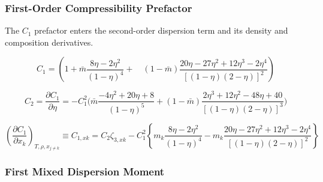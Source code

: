 \documentclass[12pt, letterpaper]{article}
\begin{document}
\subsubsection{First-Order Compressibility Prefactor}

The \(C_1\) prefactor enters the second-order dispersion term and its density and composition derivatives.

\begin{equation}
    C_{1} = \left(1+\bar{m} \frac{8 \eta-2 \eta^2}{(1-\eta)^4}+\right.\left.\quad(1-\bar{m}) \frac{20 \eta-27 \eta^2+12 \eta^3-2 \eta^4}{[(1-\eta)(2-\eta)]^2}\right)
    \label{eq:c1_disp}
\end{equation}


\begin{equation}
    C_{2}
    =\frac{\partial C_{1}}{\partial\eta}
    =- C_{1}^{2}\biggl(
    \bar{m}\frac{-4\eta^{2}+20\eta+8}{\left(1-\eta\right)^{5}}
    +(1-\bar{m})\frac{2\eta^{3}+12\eta^{2}-48\eta+40}{\left[(1-\eta)(2-\eta)\right]^{3}}
    \biggr)
    \label{eq:c2_disp}
\end{equation}


\begin{equation}
    \left(\frac{\partial C_{1}}{\partial x_{k}}\right)_{T,\rho,x_{j\neq k}}
    \equiv C_{1,xk}
    =C_{2}\zeta_{3,xk}-C_{1}^{2}\left\{m_{k}\frac{8\eta-2\eta^{2}}{\left(1-\eta\right)^{4}}-m_{k}\frac{20\eta-27\eta^{2}+12\eta^{3}-2\eta^{4}}{\left[(1-\eta)(2-\eta)\right]^{2}}\right\}
    \label{eq:c1_xk}
\end{equation}

\subsubsection{First Mixed Dispersion Moment}
\end{document}

